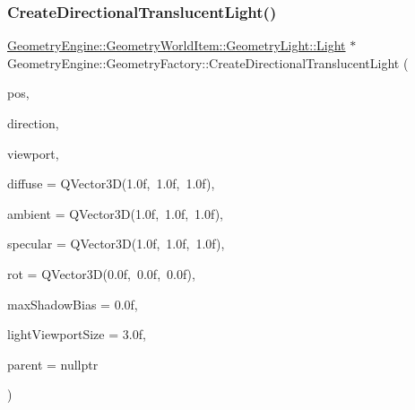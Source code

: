 \subsubsection{\texorpdfstring{CreateDirectionalTranslucentLight()}{CreateDirectionalTranslucentLight()}\hspace{0.1cm}{\footnotesize\ttfamily [2/2]}}
{\footnotesize\ttfamily \mbox{\hyperlink{class_geometry_engine_1_1_geometry_world_item_1_1_geometry_light_1_1_light}{Geometry\+Engine\+::\+Geometry\+World\+Item\+::\+Geometry\+Light\+::\+Light}} $\ast$ Geometry\+Engine\+::\+Geometry\+Factory\+::\+Create\+Directional\+Translucent\+Light (\begin{DoxyParamCaption}\item[{const Q\+Vector3D \&}]{pos,  }\item[{const Q\+Vector3D \&}]{direction,  }\item[{\mbox{\hyperlink{class_geometry_engine_1_1_geometry_item_utils_1_1_viewport}{Geometry\+Item\+Utils\+::\+Viewport}} $\ast$}]{viewport,  }\item[{const Q\+Vector3D \&}]{diffuse = {\ttfamily QVector3D(1.0f,~1.0f,~1.0f)},  }\item[{const Q\+Vector3D \&}]{ambient = {\ttfamily QVector3D(1.0f,~1.0f,~1.0f)},  }\item[{const Q\+Vector3D \&}]{specular = {\ttfamily QVector3D(1.0f,~1.0f,~1.0f)},  }\item[{const Q\+Vector3D \&}]{rot = {\ttfamily QVector3D(0.0f,~0.0f,~0.0f)},  }\item[{float}]{max\+Shadow\+Bias = {\ttfamily 0.0f},  }\item[{float}]{light\+Viewport\+Size = {\ttfamily 3.0f},  }\item[{\mbox{\hyperlink{class_geometry_engine_1_1_geometry_world_item_1_1_world_item}{Geometry\+World\+Item\+::\+World\+Item}} $\ast$}]{parent = {\ttfamily nullptr} }\end{DoxyParamCaption})\hspace{0.3cm}{\ttfamily [static]}}

